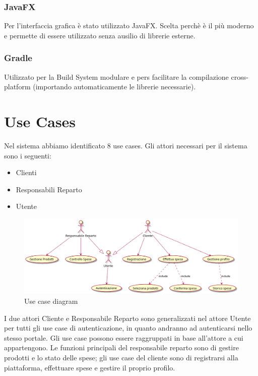 \documentclass[12pt, a4paper]{article}
\numberwithin{equation}{section} %
\begin{document}
\subsubsection{JavaFX}
Per l'interfaccia grafica è stato utilizzato JavaFX. Scelta perchè è il più moderno e permette di essere utilizzato senza ausilio di librerie esterne.
\subsubsection{Gradle}
Utilizzato per la Build System modulare e pers facilitare la compilazione cross-platform (importando automaticamente le librerie necessarie).

\section{Use Cases}

Nel sistema abbiamo identificato 8 use cases. Gli attori necessari per il 
sistema sono i seguenti:
\begin{itemize}
  \item Clienti
  \item Responsabili Reparto
  \item Utente
\end{itemize}

\begin{figure}[h]
\centering
\includegraphics[width=\textwidth]{use_case_diagram.png}
\caption{Use case diagram}
\end{figure}

I due attori Cliente e Responsabile Reparto sono generalizzati nel attore Utente
per tutti gli use case di autenticazione, in quanto andranno ad autenticarsi
nello stesso portale.  Gli use case possono essere raggruppati in base 
all'attore a cui appartengono. Le funzioni principali del responsabile reparto 
sono di gestire prodotti e lo stato delle spese; gli use case del cliente sono
di registrarsi alla piattaforma, effettuare spese e gestire il proprio profilo.

\newpage
\end{document}
